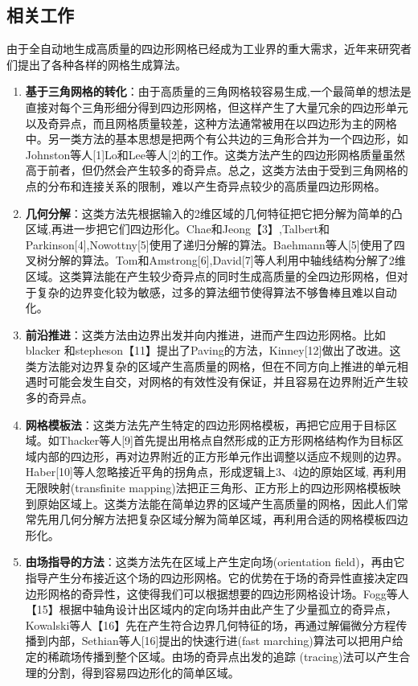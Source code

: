 \subsection{相关工作}\label{related-work}
由于全自动地生成高质量的四边形网格已经成为工业界的重大需求，近年来研究者们提出了各种各样的网格生成算法。
\begin{enumerate}
	\item \textbf{基于三角网格的转化}：由于高质量的三角网格较容易生成,一个最简单的想法是直接对每个三角形细分得到四边形网格，但这样产生了大量冗余的四边形单元以及奇异点，而且网格质量较差，这种方法通常被用在以四边形为主的网格中。另一类方法的基本思想是把两个有公共边的三角形合并为一个四边形，如Johnston等人[1]Lo和Lee等人[2]的工作。这类方法产生的四边形网格质量虽然高于前者，但仍然会产生较多的奇异点。总之，这类方法由于受到三角网格的点的分布和连接关系的限制，难以产生奇异点较少的高质量四边形网格。
	
	\item \textbf{几何分解}：这类方法先根据输入的2维区域的几何特征把它把分解为简单的凸区域,再进一步把它们四边形化。Chae和Jeong【3】,Talbert和Parkinson[4],Nowottny[5]使用了递归分解的算法。Baehmann等人[5]使用了四叉树分解的算法。Tom和Amstrong[6],David[7]等人利用中轴线结构分解了2维区域。这类算法能在产生较少奇异点的同时生成高质量的全四边形网格，但对于复杂的边界变化较为敏感，过多的算法细节使得算法不够鲁棒且难以自动化。
	
	\item \textbf{前沿推进}：这类方法由边界出发并向内推进，进而产生四边形网格。比如blacker 和stepheson【11】提出了Paving的方法，Kinney[12]做出了改进。这类方法能对边界复杂的区域产生高质量的网格，但在不同方向上推进的单元相遇时可能会发生自交，对网格的有效性没有保证，并且容易在边界附近产生较多的奇异点。
	
	\item \textbf{网格模板法}：这类方法先产生特定的四边形网格模板，再把它应用于目标区域。如Thacker等人[9]首先提出用格点自然形成的正方形网格结构作为目标区域内部的四边形，再对边界附近的正方形单元作出调整以适应不规则的边界。Haber[10]等人忽略接近平角的拐角点，形成逻辑上3、4边的原始区域, 再利用无限映射(transfinite mapping)法把正三角形、正方形上的四边形网格模板映到原始区域上。这类方法能在简单边界的区域产生高质量的网格，因此人们常常先用几何分解方法把复杂区域分解为简单区域，再利用合适的网格模板四边形化。
	
	\item \textbf{由场指导的方法}：这类方法先在区域上产生定向场(orientation field)，再由它指导产生分布接近这个场的四边形网格。它的优势在于场的奇异性直接决定四边形网格的奇异性，这使得我们可以根据想要的四边形网格设计场。Fogg等人【15】根据中轴角设计出区域内的定向场并由此产生了少量孤立的奇异点，Kowalski等人【16】先在产生符合边界几何特征的场，再通过解偏微分方程传播到内部，Sethian等人[16]提出的快速行进(fast marching)算法可以把用户给定的稀疏场传播到整个区域。由场的奇异点出发的追踪
	(tracing)法可以产生合理的分割，得到容易四边形化的简单区域。
\end{enumerate}

